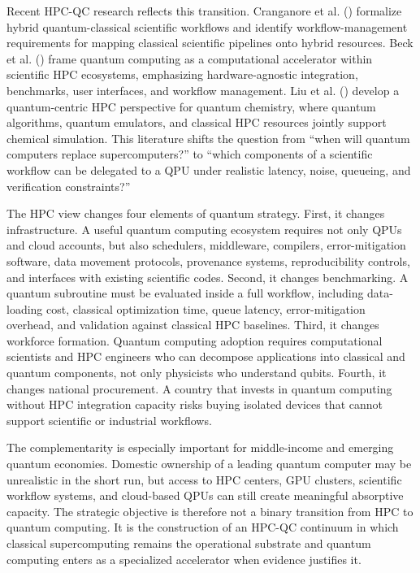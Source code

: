 \documentclass[
  11pt,
  letterpaper,
]{article}
\begin{document}
Recent HPC-QC research reflects this transition. Cranganore et al.
() formalize hybrid quantum-classical
scientific workflows and identify workflow-management requirements for
mapping classical scientific pipelines onto hybrid resources. Beck et
al. () frame quantum computing as a
computational accelerator within scientific HPC ecosystems, emphasizing
hardware-agnostic integration, benchmarks, user interfaces, and workflow
management. Liu et al. () develop a
quantum-centric HPC perspective for quantum chemistry, where quantum
algorithms, quantum emulators, and classical HPC resources jointly
support chemical simulation. This literature shifts the question from
``when will quantum computers replace supercomputers?'' to ``which
components of a scientific workflow can be delegated to a QPU under
realistic latency, noise, queueing, and verification constraints?''

The HPC view changes four elements of quantum strategy. First, it
changes infrastructure. A useful quantum computing ecosystem requires
not only QPUs and cloud accounts, but also schedulers, middleware,
compilers, error-mitigation software, data movement protocols,
provenance systems, reproducibility controls, and interfaces with
existing scientific codes. Second, it changes benchmarking. A quantum
subroutine must be evaluated inside a full workflow, including
data-loading cost, classical optimization time, queue latency,
error-mitigation overhead, and validation against classical HPC
baselines. Third, it changes workforce formation. Quantum computing
adoption requires computational scientists and HPC engineers who can
decompose applications into classical and quantum components, not only
physicists who understand qubits. Fourth, it changes national
procurement. A country that invests in quantum computing without HPC
integration capacity risks buying isolated devices that cannot support
scientific or industrial workflows.

The complementarity is especially important for middle-income and
emerging quantum economies. Domestic ownership of a leading quantum
computer may be unrealistic in the short run, but access to HPC centers,
GPU clusters, scientific workflow systems, and cloud-based QPUs can
still create meaningful absorptive capacity. The strategic objective is
therefore not a binary transition from HPC to quantum computing. It is
the construction of an HPC-QC continuum in which classical
supercomputing remains the operational substrate and quantum computing
enters as a specialized accelerator when evidence justifies it.
\end{document}
